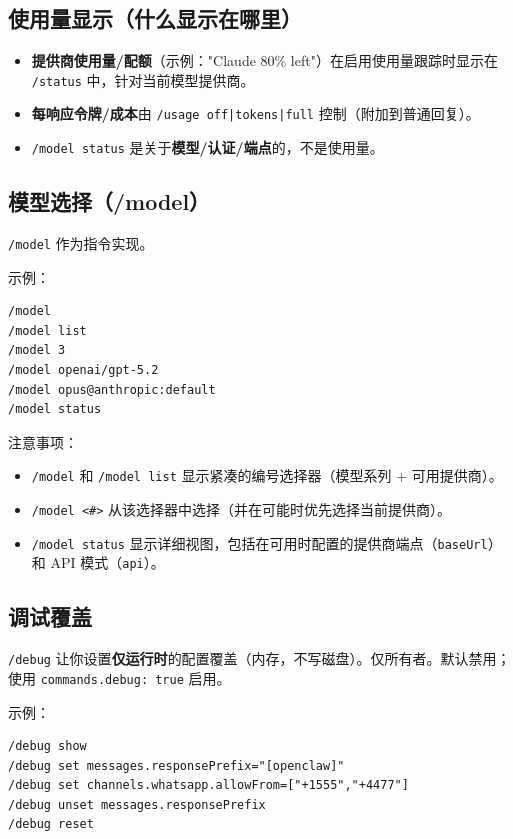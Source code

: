 \subsection{使用量显示（什么显示在哪里）}


\begin{itemize}
  \item \textbf{提供商使用量/配额}（示例："Claude 80\% left"）在启用使用量跟踪时显示在 \texttt{/status} 中，针对当前模型提供商。
  \item \textbf{每响应令牌/成本}由 \texttt{/usage off|tokens|full} 控制（附加到普通回复）。
  \item \texttt{/model status} 是关于\textbf{模型/认证/端点}的，不是使用量。
\end{itemize}


\subsection{模型选择（/model）}


\texttt{/model} 作为指令实现。

示例：

\begin{lstlisting}
/model
/model list
/model 3
/model openai/gpt-5.2
/model opus@anthropic:default
/model status
\end{lstlisting}


注意事项：

\begin{itemize}
  \item \texttt{/model} 和 \texttt{/model list} 显示紧凑的编号选择器（模型系列 + 可用提供商）。
  \item \texttt{/model <\#>} 从该选择器中选择（并在可能时优先选择当前提供商）。
  \item \texttt{/model status} 显示详细视图，包括在可用时配置的提供商端点（\texttt{baseUrl}）和 API 模式（\texttt{api}）。
\end{itemize}


\subsection{调试覆盖}


\texttt{/debug} 让你设置\textbf{仅运行时}的配置覆盖（内存，不写磁盘）。仅所有者。默认禁用；使用 \texttt{commands.debug: true} 启用。

示例：

\begin{lstlisting}
/debug show
/debug set messages.responsePrefix="[openclaw]"
/debug set channels.whatsapp.allowFrom=["+1555","+4477"]
/debug unset messages.responsePrefix
/debug reset
\end{lstlisting}


